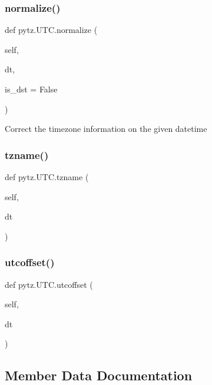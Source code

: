 \subsubsection{\texorpdfstring{normalize()}{normalize()}}
{\footnotesize\ttfamily def pytz.\+U\+T\+C.\+normalize (\begin{DoxyParamCaption}\item[{}]{self,  }\item[{}]{dt,  }\item[{}]{is\+\_\+dst = {\ttfamily False} }\end{DoxyParamCaption})}

\begin{DoxyVerb}Correct the timezone information on the given datetime\end{DoxyVerb}
 \mbox{\label{classpytz_1_1UTC_a6cc1374abd563ce95fffade469f3967f}} 
\subsubsection{\texorpdfstring{tzname()}{tzname()}}
{\footnotesize\ttfamily def pytz.\+U\+T\+C.\+tzname (\begin{DoxyParamCaption}\item[{}]{self,  }\item[{}]{dt }\end{DoxyParamCaption})}

\mbox{\label{classpytz_1_1UTC_ab4ee42d4c2c53b9c852ee9da9e4d8be6}} 
\subsubsection{\texorpdfstring{utcoffset()}{utcoffset()}}
{\footnotesize\ttfamily def pytz.\+U\+T\+C.\+utcoffset (\begin{DoxyParamCaption}\item[{}]{self,  }\item[{}]{dt }\end{DoxyParamCaption})}



\subsection{Member Data Documentation}
\mbox{\label{classpytz_1_1UTC_a4930a308980c1b69f5dbf0fcf35c094f}} 
